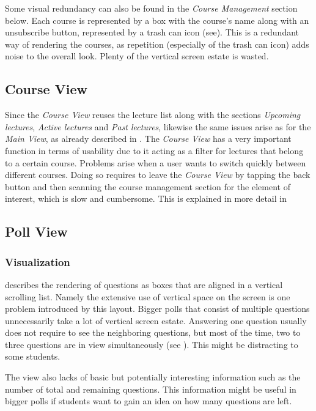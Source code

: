 Some visual redundancy can also be found in the \emph{Course Management} section below. Each course is represented by a box with the course's name along with an unsubscribe button, represented by a trash can icon (see). This is a redundant way of rendering the courses, as repetition (especially of the trash can icon) adds noise to the overall look. Plenty of the vertical screen estate is wasted.
\subsection{Course View}
\label{section:con:problems:courseview}
Since the \emph{Course View} reuses the lecture list along with the sections \emph{Upcoming lectures}, \emph{Active lectures} and \emph{Past lectures}, likewise the same issues arise as for the \emph{Main View}, as already described in . 
The \emph{Course View} has a very important function in terms of usability due to it acting as a filter for lectures that belong to a certain course. Problems arise when a user wants to switch quickly between different courses. Doing so requires to leave the \emph{Course View} by tapping the back button and then scanning the course management section for the element of interest, which is slow and cumbersome. This is explained in more detail in 

\subsection{Poll View}

\subsubsection{Visualization}
\label{section:con:problems:pollview}

 describes the rendering of questions as boxes that are aligned in a vertical scrolling list. Namely the extensive use of vertical space on the screen is one problem introduced by this layout. Bigger polls that consist of multiple questions unnecessarily take a lot of vertical screen estate. 
Answering one question usually does not require to see the neighboring questions, but most of the time, two to three questions are in view simultaneously (see ). This might be distracting to some students.

The view also lacks of basic but potentially interesting information such as the number of total and remaining questions. This information might be useful in bigger polls if students want to gain an idea on how many questions are left.

